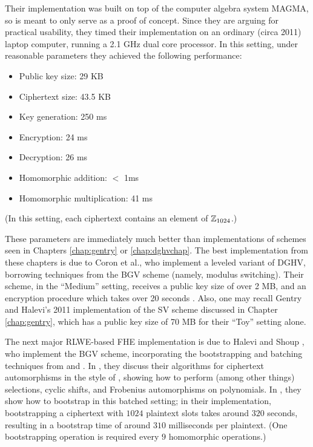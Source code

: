     Their implementation was built on top of the computer algebra system MAGMA, so is meant to only serve as a proof of concept. Since they are arguing for practical usability, they timed their implementation on an ordinary (circa 2011) laptop computer, running a 2.1 GHz dual core processor. In this setting, under reasonable parameters they achieved the following performance:
    \begin{itemize}
        \item Public key size: 29 KB
        \item Ciphertext size: 43.5 KB
        \item Key generation: 250 ms
        \item Encryption: 24 ms
        \item Decryption: 26 ms
        \item Homomorphic addition: $<$ 1ms
        \item Homomorphic multiplication: 41 ms
    \end{itemize}
    (In this setting, each ciphertext contains an element of $\mathbb{Z}_{1024}$.)

    These parameters are immediately much better than implementations of schemes seen in Chapters \ref{chap:gentry} or \ref{chap:dghvchap}. The best implementation from these chapters is due to Coron et al., who implement a leveled variant of DGHV, borrowing techniques from the BGV scheme (namely, modulus switching). Their scheme, in the ``Medium'' setting, receives a public key size of over 2 MB, and an encryption procedure which takes over 20 seconds \cite{Coron2012}. Also, one may recall Gentry and Halevi's 2011 implementation of the SV scheme discussed in Chapter \ref{chap:gentry}, which has a public key size of 70 MB for their ``Toy'' setting alone.


    The next major RLWE-based FHE implementation is due to Halevi and Shoup \cite{Halevi2014} \cite{Halevi2015}, who implement the BGV scheme, incorporating the bootstrapping and batching techniques from \cite{ghsbootstrap} and \cite{Gentry2012}. In \cite{Halevi2014}, they discuss their algorithms for ciphertext automorphisms in the style of \cite{Gentry2012}, showing how to perform (among other things) selections, cyclic shifts, and Frobenius automorphisms on polynomials. In \cite{Halevi2015}, they show how to bootstrap in this batched setting; in their implementation, bootstrapping a ciphertext with $1024$ plaintext slots takes around $320$ seconds, resulting in a bootstrap time of around $310$ milliseconds per plaintext. (One bootstrapping operation is required every $9$ homomorphic operations.)

